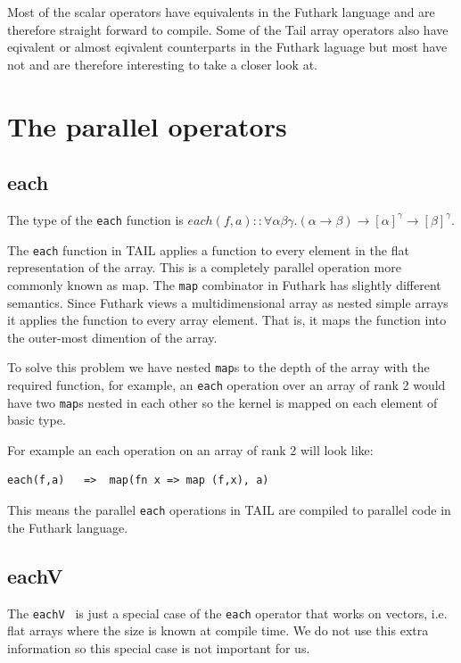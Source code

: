 \documentclass[11pt]{article}
\begin{document}
Most of the scalar operators have equivalents in the Futhark language and are therefore straight forward to compile.
Some of the Tail array operators also have eqivalent or almost eqivalent counterparts in the Futhark laguage
but most have not and are therefore interesting to take a closer look at.


\section{The parallel operators}

\subsection{each}

The type of the {\tt each} function is $each(f,a) :: \forall\alpha\beta\gamma.(\alpha \to \beta) \to [\alpha]^\gamma \to [\beta]^\gamma$.

The {\tt each} function in TAIL applies a function to every element in the flat representation of the array.
This is a completely parallel operation more commonly known as map.
The {\tt map} combinator in Futhark has slightly different semantics.
Since Futhark views a multidimensional array as nested simple arrays it applies the function to every array element.
That is, it maps the function into the outer-most dimention of the array.

To solve this problem we have nested {\tt map}s to the depth of the array with the required function,
for example, an {\tt each} operation over an array of rank 2 would have two {\tt map}s nested in each other so the kernel is
mapped on each element of basic type.

For example an each operation on an array of rank 2 will look like:
\begin{lstlisting}[numbers=none,frame=none]
each(f,a)	=>	map(fn x => map (f,x), a)
\end{lstlisting}

This means the parallel {\tt each} operations in TAIL are compiled to parallel code in the Futhark language.

\subsection{eachV}
The {\tt eachV } is just a special case of the {\tt each} operator that works on vectors, i.e. flat arrays where the size
is known at compile time. We do not use this extra information so this special case is not important for us.
\end{document}
